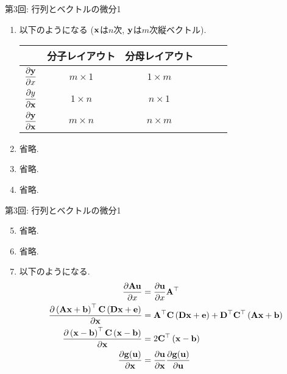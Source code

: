 \documentclass[dvipdfmx,notheorems,t]{beamer}
\begin{document}
\begin{frame}{第3回: 行列とベクトルの微分1}
\begin{enumerate}
  \item 以下のようになる ($\vb{x}$は$n$次, $\vb{y}$は$m$次縦ベクトル).
  \begin{table}[h]
    \centering
    \begin{tabular}{ScScSc} \hline
      & 分子レイアウト & 分母レイアウト \\ \hline
      $\displaystyle \pdv{\vb{y}}{x}$ & $m \times 1$ & $1 \times m$ \\
      $\displaystyle \pdv{y}{\vb{x}}$ & $1 \times n$ & $n \times 1$ \\
      $\displaystyle \pdv{\vb{y}}{\vb{x}}$ & $m \times n$ & $n \times m$ \\ \hline
    \end{tabular}
  \end{table}

  \item 省略.
  \item 省略.
  \item 省略.
\end{enumerate}
\end{frame}

\begin{frame}{第3回: 行列とベクトルの微分1}
\begin{enumerate}
  \setcounter{enumi}{4}
  \item 省略.
  \item 省略.
  \item 以下のようになる.
  \begin{align*}
    \pdv{\vb{A} \vb{u}}{x} &= \pdv{\vb{u}}{x} \vb{A}^\top \\
    \pdv{\left( \vb{A} \vb{x} + \vb{b} \right)^\top \vb{C} \left( \vb{D} \vb{x} + \vb{e} \right)}{\vb{x}}
      &= \vb{A}^\top \vb{C} \left( \vb{D} \vb{x} + \vb{e} \right)
        + \vb{D}^\top \vb{C}^\top \left( \vb{A} \vb{x} + \vb{b} \right) \\
    \pdv{\left( \vb{x} - \vb{b} \right)^\top \vb{C} \left( \vb{x} - \vb{b} \right)}{\vb{x}}
      &= 2 \vb{C}^\top \left( \vb{x} - \vb{b} \right) \\
    \pdv{\vb{g}(\vb{u})}{\vb{x}} &= \pdv{\vb{u}}{\vb{x}} \pdv{\vb{g}(\vb{u})}{\vb{u}}
  \end{align*}
\end{enumerate}
\end{frame}
\end{document}
